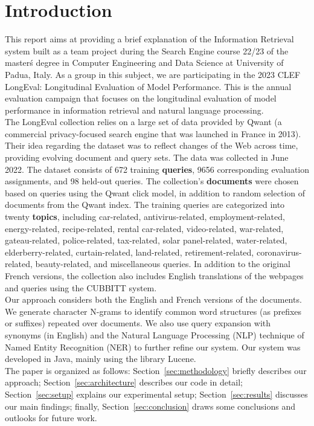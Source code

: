 \section{Introduction}\label{sec:introduction}
This report aims at providing a brief explanation of the Information Retrieval system built
as a team project during the Search Engine course 22/23 of the master\'s degree in Computer Engineering and Data Science at University of Padua, Italy. As a group in this subject, we are participating in the 2023 CLEF LongEval: Longitudinal Evaluation of Model Performance. This is the annual evaluation campaign that focuses on the longitudinal evaluation of model performance in information
retrieval and natural language processing.\\
The LongEval collection\cite{traindata} relies on a large set of data provided by Qwant (a commercial privacy-focused
search engine that was launched in France in 2013). %
Their idea regarding the dataset was to reflect changes of the Web across time, providing evolving document and query
sets.
The data was collected in June 2022.
The dataset consists of 672 training \textbf{queries}, 9656 corresponding evaluation assignments, and 98 held-out queries.
The collection's \textbf{documents} were chosen based on queries using the Qwant click model, in addition to random
selection of documents from the Qwant index.
The training queries are categorized into twenty \textbf{topics}, including car-related, antivirus-related,
employment-related, energy-related, recipe-related, rental car-related, video-related, war-related, gateau-related,
police-related, tax-related, solar panel-related, water-related, elderberry-related, curtain-related, land-related,
retirement-related, coronavirus-related, beauty-related, and miscellaneous queries.
In addition to the original French versions, the collection also includes English translations of the webpages and
queries using the CUBBITT system.\\
Our approach considers both the English and French versions of the documents.
We generate character N-grams to identify common word structures (as prefixes or suffixes) repeated over documents.
We also use query expansion with synonyms (in English) and the Natural Language Processing (NLP) technique of Named
Entity Recognition (NER) to further refine our system.
Our system was developed in Java, mainly using the library Lucene.\\
The paper is organized as follows:
Section~\ref{sec:methodology} briefly describes our approach;
Section~\ref{sec:architecture} describes our code in detail;
Section~\ref{sec:setup} explains our experimental setup;
Section~\ref{sec:results} discusses our main findings; finally,
Section~\ref{sec:conclusion} draws some conclusions and outlooks for future work.